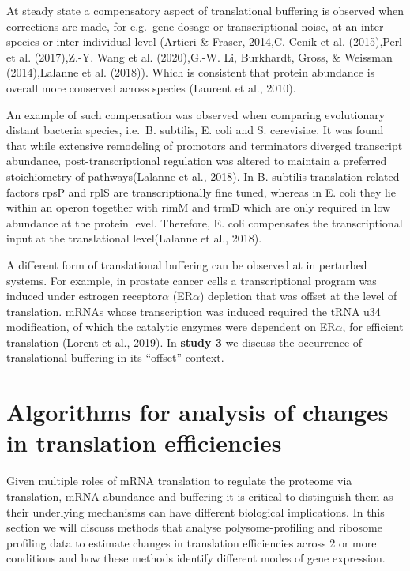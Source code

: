 \documentclass[12pt,openany]{book}
\begin{document}
At steady state a compensatory aspect of translational buffering is
observed when corrections are made, for e.g.~gene dosage or
transcriptional noise, at an inter-species or inter-individual level
(Artieri \& Fraser, 2014,C. Cenik et al. (2015),Perl et al. (2017),Z.-Y.
Wang et al. (2020),G.-W. Li, Burkhardt, Gross, \& Weissman
(2014),Lalanne et al. (2018)). Which is consistent that protein
abundance is overall more conserved across species (Laurent et al.,
2010).

An example of such compensation was observed when comparing evolutionary
distant bacteria species, i.e.~B. subtilis, E. coli and S. cerevisiae.
It was found that while extensive remodeling of promotors and
terminators diverged transcript abundance, post-transcriptional
regulation was altered to maintain a preferred stoichiometry of
pathways(Lalanne et al., 2018). In B. subtilis translation related
factors rpsP and rplS are transcriptionally fine tuned, whereas in E.
coli they lie within an operon together with rimM and trmD which are
only required in low abundance at the protein level. Therefore, E. coli
compensates the transcriptional input at the translational level(Lalanne
et al., 2018).

A different form of translational buffering can be observed at in
perturbed systems. For example, in prostate cancer cells a
transcriptional program was induced under estrogen receptor\(\alpha\)
(ER\(\alpha\)) depletion that was offset at the level of translation.
mRNAs whose transcription was induced required the tRNA u34
modification, of which the catalytic enzymes were dependent on
ER\(\alpha\), for efficient translation (Lorent et al., 2019). In
\textbf{study 3} we discuss the occurrence of translational buffering in
its ``offset'' context. \newline

\section{Algorithms for analysis of changes in translation efficiencies}\label{algorithm}

Given multiple roles of mRNA translation to regulate the proteome via
translation, mRNA abundance and buffering it is critical to distinguish
them as their underlying mechanisms can have different biological
implications. In this section we will discuss methods that analyse
polysome-profiling and ribosome profiling data to estimate changes in
translation efficiencies across 2 or more conditions and how these
methods identify different modes of gene expression.
\end{document}
